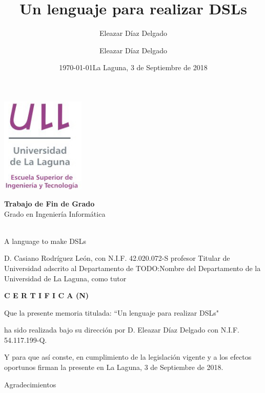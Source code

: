 \documentclass[11pt]{article}
\author{Eleazar Díaz Delgado }
\date{\today}
\title{}
\begin{document}
\title{Un lenguaje para realizar DSLs}
\author{Eleazar Díaz Delgado}

\date{La Laguna, 3 de Septiembre de 2018}

\makeatletter
\begin{titlepage}
    \includegraphics[width=40mm]{ull-logo.jpg}\\[4ex]
    \begin{center}
        {\huge \bfseries  Trabajo de Fin de Grado }\\[2ex]
        {\LARGE  Grado en Ingeniería Informática}\\[5ex]
    \end{center}
    \begin{flushright}
        {\huge \bfseries  \@title }\\[2ex]
        {\huge  A language to make DSLs }\\[2ex]
        {\LARGE  \@author}
    \end{flushright}
    \vfill
    \begin{center}
        {\LARGE \@date}
    \end{center}

\end{titlepage}
\makeatother
\thispagestyle{empty}
\newpage


D. Casiano Rodríguez León, con N.I.F. 42.020.072-S profesor Titular de Universidad adscrito al Departamento de TODO:Nombre del Departamento de la Universidad de La Laguna, como tutor

{\large \bfseries C E R T I F I C A (N)}

Que la presente memoria titulada: “Un lenguaje para realizar DSLs"

ha sido realizada bajo su dirección por D. Eleazar Díaz Delgado
con N.I.F. 54.117.199-Q.

Y para que así conste, en cumplimiento de la legislación vigente y a los efectos oportunos firman la presente en La Laguna, 3 de Septiembre de 2018.
\newpage
\begin{flushright}
    {\huge  Agradecimientos }\\[2ex]
\end{flushright}
\end{document}
